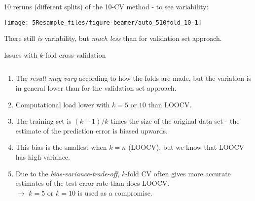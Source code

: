\documentclass[10pt,ignorenonframetext,]{beamer}
\providecommand{\tightlist}{%
  \setlength{\itemsep}{0pt}\setlength{\parskip}{0pt}}
\begin{document}
\begin{frame}

10 reruns (different splits) of the 10-CV method - to see variability:

\begin{center}\texttt{[image: 5Resample\_files/figure-beamer/auto\_510fold\_10-1]} \end{center}

There still \emph{is} variability, but \emph{much less} than for
validation set approach.

\end{frame}

\begin{frame}

\begin{block}{Issues with \(k\)-fold cross-validation}

\(~\)

\begin{enumerate}
\tightlist
\item
  The \emph{result may vary} according to how the folds are made, but
  the variation is in general lower than for the validation set
  approach.
\end{enumerate}

\vspace{2mm}

\begin{enumerate}
\setcounter{enumi}{1}
\tightlist
\item
  Computational load lower with \(k=5\) or \(10\) than LOOCV.
\end{enumerate}

\vspace{2mm}

\begin{enumerate}
\setcounter{enumi}{2}
\tightlist
\item
  The training set is \((k-1)/k\) times the size of the original data
  set - the estimate of the prediction error is biased upwards.
\end{enumerate}

\vspace{2mm}

\begin{enumerate}
\setcounter{enumi}{3}
\tightlist
\item
  This bias is the smallest when \(k=n\) (LOOCV), but we know that LOOCV
  has high variance.
\end{enumerate}

\vspace{2mm}

\begin{enumerate}
\setcounter{enumi}{4}
\tightlist
\item
  Due to the \emph{bias-variance-trade-off}, \(k\)-fold CV often gives
  more accurate estimates of the test error rate than does LOOCV.\\
  \(\rightarrow\) \(k=5\) or \(k=10\) is used as a compromise.
\end{enumerate}

\end{block}

\end{frame}
\end{document}
